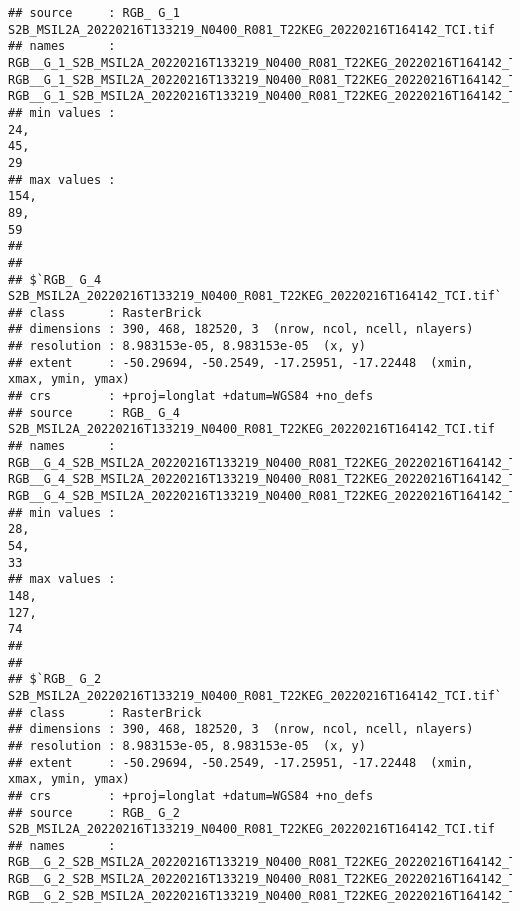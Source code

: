 \documentclass[
]{article}
\begin{document}
\begin{verbatim}
## source     : RGB_ G_1 S2B_MSIL2A_20220216T133219_N0400_R081_T22KEG_20220216T164142_TCI.tif 
## names      : RGB__G_1_S2B_MSIL2A_20220216T133219_N0400_R081_T22KEG_20220216T164142_TCI.1, RGB__G_1_S2B_MSIL2A_20220216T133219_N0400_R081_T22KEG_20220216T164142_TCI.2, RGB__G_1_S2B_MSIL2A_20220216T133219_N0400_R081_T22KEG_20220216T164142_TCI.3 
## min values :                                                                          24,                                                                          45,                                                                          29 
## max values :                                                                         154,                                                                          89,                                                                          59 
## 
## 
## $`RGB_ G_4 S2B_MSIL2A_20220216T133219_N0400_R081_T22KEG_20220216T164142_TCI.tif`
## class      : RasterBrick 
## dimensions : 390, 468, 182520, 3  (nrow, ncol, ncell, nlayers)
## resolution : 8.983153e-05, 8.983153e-05  (x, y)
## extent     : -50.29694, -50.2549, -17.25951, -17.22448  (xmin, xmax, ymin, ymax)
## crs        : +proj=longlat +datum=WGS84 +no_defs 
## source     : RGB_ G_4 S2B_MSIL2A_20220216T133219_N0400_R081_T22KEG_20220216T164142_TCI.tif 
## names      : RGB__G_4_S2B_MSIL2A_20220216T133219_N0400_R081_T22KEG_20220216T164142_TCI.1, RGB__G_4_S2B_MSIL2A_20220216T133219_N0400_R081_T22KEG_20220216T164142_TCI.2, RGB__G_4_S2B_MSIL2A_20220216T133219_N0400_R081_T22KEG_20220216T164142_TCI.3 
## min values :                                                                          28,                                                                          54,                                                                          33 
## max values :                                                                         148,                                                                         127,                                                                          74 
## 
## 
## $`RGB_ G_2 S2B_MSIL2A_20220216T133219_N0400_R081_T22KEG_20220216T164142_TCI.tif`
## class      : RasterBrick 
## dimensions : 390, 468, 182520, 3  (nrow, ncol, ncell, nlayers)
## resolution : 8.983153e-05, 8.983153e-05  (x, y)
## extent     : -50.29694, -50.2549, -17.25951, -17.22448  (xmin, xmax, ymin, ymax)
## crs        : +proj=longlat +datum=WGS84 +no_defs 
## source     : RGB_ G_2 S2B_MSIL2A_20220216T133219_N0400_R081_T22KEG_20220216T164142_TCI.tif 
## names      : RGB__G_2_S2B_MSIL2A_20220216T133219_N0400_R081_T22KEG_20220216T164142_TCI.1, RGB__G_2_S2B_MSIL2A_20220216T133219_N0400_R081_T22KEG_20220216T164142_TCI.2, RGB__G_2_S2B_MSIL2A_20220216T133219_N0400_R081_T22KEG_20220216T164142_TCI.3 

\end{verbatim}
\end{document}
